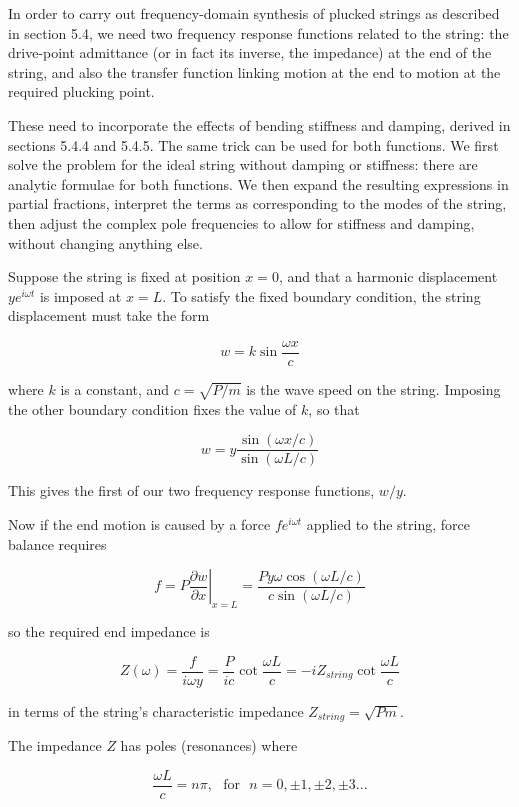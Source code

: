   In order to carry out frequency-domain synthesis of plucked strings as 
  described in section 5.4, we need two frequency response functions related to 
  the string: the drive-point admittance (or in fact its inverse, the 
  impedance) at the end of the string, and also the transfer function linking 
  motion at the end to motion at the required plucking point. 

  These need to incorporate the effects of bending stiffness and damping, 
  derived in sections 5.4.4 and 5.4.5. The same trick can be used for both 
  functions. We first solve the problem for the ideal string without damping or 
  stiffness: there are analytic formulae for both functions. We then expand the 
  resulting expressions in partial fractions, interpret the terms as 
  corresponding to the modes of the string, then adjust the complex pole 
  frequencies to allow for stiffness and damping, without changing anything 
  else. 

  Suppose the string is fixed at position $x=0$, and that a harmonic 
  displacement $y e^{i \omega t}$ is imposed at $x=L$. To satisfy the fixed 
  boundary condition, the string displacement must take the form 

  $$w=k \sin \frac{\omega x}{c} \tag{1}$$ 

  where $k$ is a constant, and $c=\sqrt{P/m}$ is the wave speed on the string. 
  Imposing the other boundary condition fixes the value of $k$, so that 

  $$w=y \dfrac{ \sin (\omega x/c)}{ \sin (\omega L/c)} \tag{2}$$ 

  This gives the first of our two frequency response functions, $w/y$. 

  Now if the end motion is caused by a force $f e^{i \omega t}$ applied to the 
  string, force balance requires 

  $$f=P \left. \dfrac{\partial w}{\partial x} \right|_{x=L}=\dfrac{Py\omega 
  \cos(\omega L/c)}{c \sin (\omega L/c)} \tag{3}$$ 

  so the required end impedance is 

  $$Z(\omega)=\frac{f}{i \omega y}=\frac{P}{ic} \cot \frac{\omega L}{c}=-i 
  Z_{string} \cot \frac{\omega L}{c} \tag{4}$$ 

  in terms of the string's characteristic impedance $Z_{string}=\sqrt{Pm}$. 

  The impedance $Z$ has poles (resonances) where 

  $$\frac{\omega L}{c} = n \pi, \mathrm{~~~for~~~}n=0, \pm 1,\pm 2,\pm 3... 
  \tag{5}$$ 

